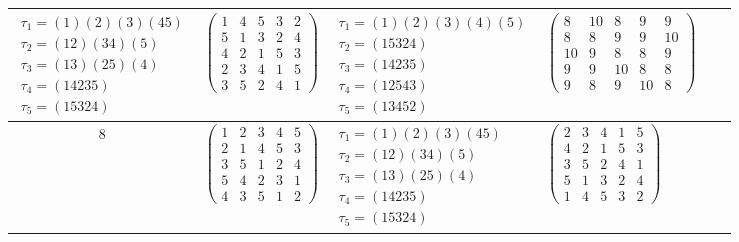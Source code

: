 \begin{longtable}{|c|p{2.7cm}|p{2.7cm}|p{2.7cm}|p{2.7cm}|p{3.3cm}|}
    $\begin{array}{l}\tau_{1}=(1)(2)(3)(45)\\ \tau_{2}=(12)(34)(5)\\ \tau_{3}=(13)(25)(4)\\ \tau_{4}=(14235)\\ \tau_{5}=(15324)\end{array}$     &
    $\begin{pmatrix}1&4&5&3&2\\5&1&3&2&4\\4&2&1&5&3\\2&3&4&1&5\\3&5&2&4&1\end{pmatrix}$                                                         &
    $\begin{array}{l}\tau_{1}=(1)(2)(3)(4)(5)\\ \tau_{2}=(15324)\\ \tau_{3}=(14235)\\ \tau_{4}=(12543)\\ \tau_{5}=(13452)\end{array}$           &
    $\begin{pmatrix}8&10&8&9&9\\8&8&9&9&10\\10&9&8&8&9\\9&9&10&8&8\\9&8&9&10&8\end{pmatrix}$                                                                                                                                \\
    \hline
    8                                                                                                                                           &
    $\begin{pmatrix}1&2&3&4&5\\2&1&4&5&3\\3&5&1&2&4\\5&4&2&3&1\\4&3&5&1&2\end{pmatrix}$                                                         &
    $\begin{array}{l}\tau_{1}=(1)(2)(3)(45)\\ \tau_{2}=(12)(34)(5)\\ \tau_{3}=(13)(25)(4)\\ \tau_{4}=(14235)\\ \tau_{5}=(15324)\end{array}$     &
    $\begin{pmatrix}2&3&4&1&5\\4&2&1&5&3\\3&5&2&4&1\\5&1&3&2&4\\1&4&5&3&2\end{pmatrix}$                                                         &

\end{longtable}
